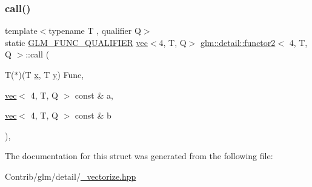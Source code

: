 \subsubsection{\texorpdfstring{call()}{call()}}
{\footnotesize\ttfamily template$<$typename T , qualifier Q$>$ \\
static \mbox{\hyperlink{setup_8hpp_a33fdea6f91c5f834105f7415e2a64407}{G\+L\+M\+\_\+\+F\+U\+N\+C\+\_\+\+Q\+U\+A\+L\+I\+F\+I\+ER}} \mbox{\hyperlink{structglm_1_1vec}{vec}}$<$4, T, Q$>$ \mbox{\hyperlink{structglm_1_1detail_1_1functor2}{glm\+::detail\+::functor2}}$<$ 4, T, Q $>$\+::call (\begin{DoxyParamCaption}\item[{T($\ast$)(T \mbox{\hyperlink{_s_d_l__opengl_8h_ad0e63d0edcdbd3d79554076bf309fd47}{x}}, T \mbox{\hyperlink{_s_d_l__opengl_8h_a1675d9d7bb68e1657ff028643b4037e3}{y}})}]{Func,  }\item[{\mbox{\hyperlink{structglm_1_1vec}{vec}}$<$ 4, T, Q $>$ const \&}]{a,  }\item[{\mbox{\hyperlink{structglm_1_1vec}{vec}}$<$ 4, T, Q $>$ const \&}]{b }\end{DoxyParamCaption})\hspace{0.3cm}{\ttfamily [inline]}, {\ttfamily [static]}}



The documentation for this struct was generated from the following file\+:\begin{DoxyCompactItemize}
\item 
Contrib/glm/detail/\mbox{\hyperlink{__vectorize_8hpp}{\+\_\+vectorize.\+hpp}}\end{DoxyCompactItemize}
